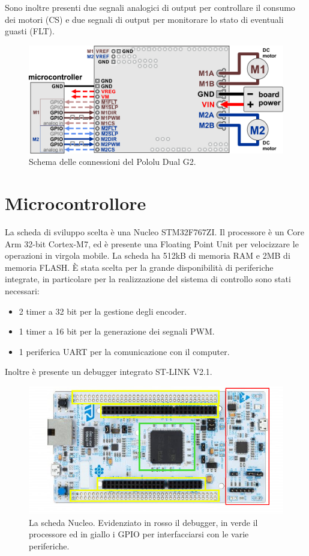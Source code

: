 Sono inoltre presenti due segnali analogici di output per controllare il consumo dei motori (CS) e due segnali di output per monitorare lo stato di eventuali guasti (FLT).

\begin{figure}[H]
\centering
\includegraphics[scale=1.4]{images/pololu.png}
\caption{Schema delle connessioni del Pololu Dual G2.}
\end{figure}


\section{Microcontrollore}
La scheda di sviluppo scelta è una Nucleo STM32F767ZI.
Il processore è un Core Arm 32-bit Cortex-M7, ed è presente una Floating Point Unit per velocizzare le operazioni in virgola mobile.
La scheda ha 512kB di memoria RAM e 2MB di memoria FLASH.
È stata scelta per la grande disponibilità di periferiche integrate, in particolare per la realizzazione del sistema di controllo sono stati necessari: 
\begin{itemize}
    \item 2 timer a 32 bit per la gestione degli encoder.
    \item 1 timer a 16 bit per la generazione dei segnali PWM.
    \item 1 periferica UART per la comunicazione con il computer.
\end{itemize}
Inoltre è presente un debugger integrato ST-LINK V2.1.

\begin{figure}[H]
\centering
\includegraphics[scale=0.65]{images/nucleo.png}
\caption{La scheda Nucleo. Evidenziato in rosso il debugger, in verde il processore ed in giallo i GPIO per interfacciarsi con le varie periferiche.}
\end{figure}

